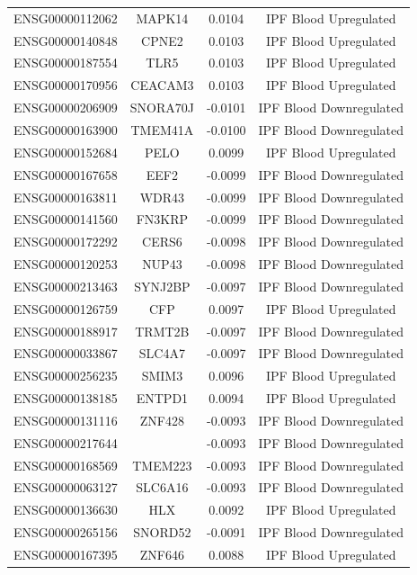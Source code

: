 \documentclass[
]{article}
\begin{document}
\begin{singlespace}
\begin{longtable}[t]{lccc}
\addlinespace
ENSG00000112062 & MAPK14 & 0.0104 & IPF Blood Upregulated\\
ENSG00000140848 & CPNE2 & 0.0103 & IPF Blood Upregulated\\
ENSG00000187554 & TLR5 & 0.0103 & IPF Blood Upregulated\\
ENSG00000170956 & CEACAM3 & 0.0103 & IPF Blood Upregulated\\
ENSG00000206909 & SNORA70J & -0.0101 & IPF Blood Downregulated\\
\addlinespace
ENSG00000163900 & TMEM41A & -0.0100 & IPF Blood Downregulated\\
ENSG00000152684 & PELO & 0.0099 & IPF Blood Upregulated\\
ENSG00000167658 & EEF2 & -0.0099 & IPF Blood Downregulated\\
ENSG00000163811 & WDR43 & -0.0099 & IPF Blood Downregulated\\
ENSG00000141560 & FN3KRP & -0.0099 & IPF Blood Downregulated\\
\addlinespace
ENSG00000172292 & CERS6 & -0.0098 & IPF Blood Downregulated\\
ENSG00000120253 & NUP43 & -0.0098 & IPF Blood Downregulated\\
ENSG00000213463 & SYNJ2BP & -0.0097 & IPF Blood Downregulated\\
ENSG00000126759 & CFP & 0.0097 & IPF Blood Upregulated\\
ENSG00000188917 & TRMT2B & -0.0097 & IPF Blood Downregulated\\
\addlinespace
ENSG00000033867 & SLC4A7 & -0.0097 & IPF Blood Downregulated\\
ENSG00000256235 & SMIM3 & 0.0096 & IPF Blood Upregulated\\
ENSG00000138185 & ENTPD1 & 0.0094 & IPF Blood Upregulated\\
ENSG00000131116 & ZNF428 & -0.0093 & IPF Blood Downregulated\\
ENSG00000217644 &  & -0.0093 & IPF Blood Downregulated\\
\addlinespace
ENSG00000168569 & TMEM223 & -0.0093 & IPF Blood Downregulated\\
ENSG00000063127 & SLC6A16 & -0.0093 & IPF Blood Downregulated\\
ENSG00000136630 & HLX & 0.0092 & IPF Blood Upregulated\\
ENSG00000265156 & SNORD52 & -0.0091 & IPF Blood Downregulated\\
ENSG00000167395 & ZNF646 & 0.0088 & IPF Blood Upregulated\\

\end{longtable}
\end{singlespace}
\end{document}
